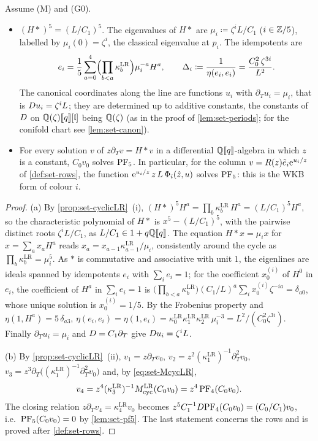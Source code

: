 
\begin{cor}
\label{cor:set-cyclicPF5}
Assume (M) and (G0).
\begin{itemize}
\item[(a)] $(H*)^5=(L/C_1)^5$. The eigenvalues of $H*$ are $\mu_i\coloneqq\zeta^iL/C_1$ ($i\in\mathbb{Z}/5$), labelled by $\mu_i(0)=\zeta^i$, the classical eigenvalue at $p_i$. The idempotents are
\[
e_i=\frac15\sum_{a=0}^4\Bigl(\prod_{b<a}\kappa^{\mathrm{LR}}_b\Bigr)\mu_i^{-a}H^a,\qquad\Delta_i\coloneqq\frac1{\eta(e_i,e_i)}=\frac{C_0^2\,\zeta^{3i}}{L^2}.
\]
The canonical coordinates along the line are functions $u_i$ with $\partial_Tu_i=\mu_i$, that is $D u_i=\zeta^iL$; they are determined up to additive constants, the constants of $D$ on $\mathbb{Q}(\zeta)[\![ q ]\!][\mathfrak{l}]$ being $\mathbb{Q}(\zeta)$ (as in the proof of \cref{lem:set-periods}; for the conifold chart see \cref{lem:set-canon}).
\item[(b)] For every solution $v$ of $z\partial_Tv=H*v$ in a differential $\mathbb{Q}[\![ q ]\!]$-algebra in which $z$ is a constant, $C_0v_0$ solves $\mathrm{PF}_{5}$. In particular, for the column $v=R(z)\tilde e_i\mathrm{e}^{u_i/z}$ of \cref{def:set-rows}, the function $\mathrm{e}^{u_i/z}\,z\,L\,\Phi_i(\hat{z},u)$ solves $\mathrm{PF}_{5}$: this is the WKB form of colour $i$.
\end{itemize}
\end{cor}

\begin{proof}
(a) By \cref{prop:set-cyclicLR}~(i), $(H*)^5H^a=\prod_b\kappa^{\mathrm{LR}}_b\,H^a=(L/C_1)^5H^a$, so the characteristic polynomial of $H*$ is $x^5-(L/C_1)^5$, with the pairwise distinct roots $\zeta^iL/C_1$, as $L/C_1\in1+q\mathbb{Q}[\![ q ]\!]$. The equation $H*x=\mu_ix$ for $x=\sum_ax_aH^a$ reads $x_a=x_{a-1}\kappa^{\mathrm{LR}}_{a-1}/\mu_i$, consistently around the cycle as $\prod_b\kappa^{\mathrm{LR}}_b=\mu_i^5$. As $*$ is commutative and associative with unit $1$, the eigenlines are ideals spanned by idempotents $e_i$ with $\sum_ie_i=1$; for the coefficient $x_0^{(i)}$ of $H^0$ in $e_i$, the coefficient of $H^a$ in $\sum_ie_i=1$ is $\bigl(\prod_{b<a}\kappa^{\mathrm{LR}}_b\bigr)(C_1/L)^a\sum_ix_0^{(i)}\zeta^{-ia}=\delta_{a0}$, whose unique solution is $x_0^{(i)}=1/5$. By the Frobenius property and $\eta(1,H^a)=5\,\delta_{a3}$, $\eta(e_i,e_i)=\eta(1,e_i)=\kappa^{\mathrm{LR}}_0\kappa^{\mathrm{LR}}_1\kappa^{\mathrm{LR}}_2\,\mu_i^{-3}=L^2/(C_0^2\zeta^{3i})$. Finally $\partial_Tu_i=\mu_i$ and $D=C_1\partial_T$ give $D u_i=\zeta^iL$.

(b) By \cref{prop:set-cyclicLR}~(ii), $v_1=z\partial_Tv_0$, $v_2=z^2(\kappa^{\mathrm{LR}}_1)^{-1}\partial_T^2v_0$, $v_3=z^3\partial_T\bigl((\kappa^{\mathrm{LR}}_1)^{-1}\partial_T^2v_0\bigr)$ and, by \eqref{eq:set-McycLR},
\[
v_4=z^4(\kappa^{\mathrm{LR}}_3)^{-1}M_{\mathrm{cyc}}^{\mathrm{LR}}(C_0v_0)=z^4\,\mathrm{PF}_{4}(C_0v_0).
\]
The closing relation $z\partial_Tv_4=\kappa^{\mathrm{LR}}_4v_0$ becomes $z^5C_1^{-1}D\mathrm{PF}_{4}(C_0v_0)=(C_0/C_1)v_0$, i.e.\ $\mathrm{PF}_{5}(C_0v_0)=0$ by \cref{lem:set-pf5}. The last statement concerns the rows and is proved after \cref{def:set-rows}.
\end{proof}

